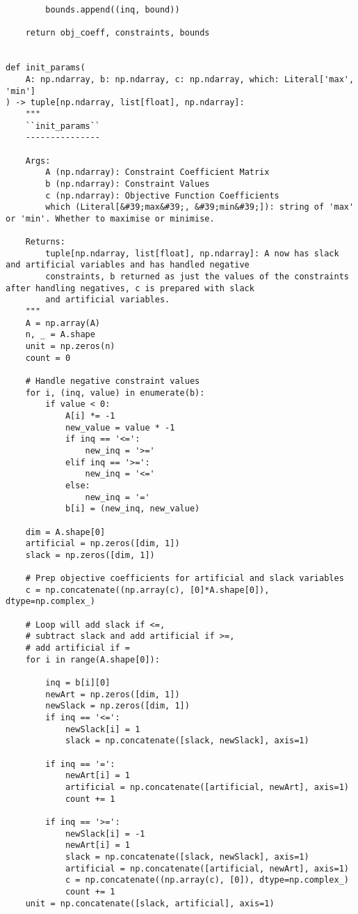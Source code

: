\documentclass[letterpaper, a4paper]{article}
\begin{document}
\begin{verbatim}
        bounds.append((inq, bound))

    return obj_coeff, constraints, bounds


def init_params(
    A: np.ndarray, b: np.ndarray, c: np.ndarray, which: Literal['max', 'min']
) -> tuple[np.ndarray, list[float], np.ndarray]:
    """
    ``init_params``
    ---------------

    Args:
        A (np.ndarray): Constraint Coefficient Matrix
        b (np.ndarray): Constraint Values
        c (np.ndarray): Objective Function Coefficients
        which (Literal[&#39;max&#39;, &#39;min&#39;]): string of 'max' or 'min'. Whether to maximise or minimise.

    Returns:
        tuple[np.ndarray, list[float], np.ndarray]: A now has slack and artificial variables and has handled negative
        constraints, b returned as just the values of the constraints after handling negatives, c is prepared with slack
        and artificial variables.
    """
    A = np.array(A)
    n, _ = A.shape
    unit = np.zeros(n)
    count = 0

    # Handle negative constraint values
    for i, (inq, value) in enumerate(b):
        if value < 0:
            A[i] *= -1
            new_value = value * -1
            if inq == '<=':
                new_inq = '>='
            elif inq == '>=':
                new_inq = '<='
            else:
                new_inq = '='
            b[i] = (new_inq, new_value)

    dim = A.shape[0]
    artificial = np.zeros([dim, 1])
    slack = np.zeros([dim, 1])

    # Prep objective coefficients for artificial and slack variables
    c = np.concatenate((np.array(c), [0]*A.shape[0]), dtype=np.complex_)

    # Loop will add slack if <=,
    # subtract slack and add artificial if >=,
    # add artificial if =
    for i in range(A.shape[0]):

        inq = b[i][0]
        newArt = np.zeros([dim, 1])
        newSlack = np.zeros([dim, 1])
        if inq == '<=':
            newSlack[i] = 1
            slack = np.concatenate([slack, newSlack], axis=1)

        if inq == '=':
            newArt[i] = 1
            artificial = np.concatenate([artificial, newArt], axis=1)
            count += 1

        if inq == '>=':
            newSlack[i] = -1
            newArt[i] = 1
            slack = np.concatenate([slack, newSlack], axis=1)
            artificial = np.concatenate([artificial, newArt], axis=1)
            c = np.concatenate((np.array(c), [0]), dtype=np.complex_)
            count += 1
    unit = np.concatenate([slack, artificial], axis=1)


\end{verbatim}
\end{document}

